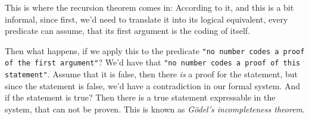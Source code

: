This is where the recursion theorem comes in: According to it, and this is a 
bit informal, since first, we'd need to translate it into its logical 
equivalent, every predicate can assume, that its first argument is the coding 
of itself.

Then what happens, if we apply this to the predicate {\tt "no number codes a proof 
of the first argument"}? We'd have that {\tt "no number codes a proof of this
statement"}. Assume that it is false, then there {\em is}\/ a proof for the 
statement, but since the statement is false, we'd have a contradiction in our 
formal system. And if the statement is true? Then there is a true statement 
expressable in the system, that can not be proven. This is known as {\em Gödel's 
incompleteness theorem}. 
